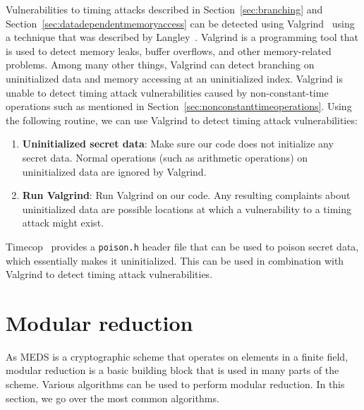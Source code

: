 \documentclass[11pt,a4paper]{report}
\theoremstyle{definition}
\begin{document}
Vulnerabilities to timing attacks described in Section~\ref{sec:branching} and Section~\ref{sec:datadependentmemoryaccess} can be detected using Valgrind~\cite{nethercote2007valgrind} using a technique that was described by Langley~\cite{langley2010checking}. Valgrind is a programming tool that is used to detect memory leaks, buffer overflows, and other memory-related problems. Among many other things, Valgrind can detect branching on uninitialized data and memory accessing at an uninitialized index. Valgrind is unable to detect timing attack vulnerabilities caused by non-constant-time operations such as mentioned in Section~\ref{sec:nonconstanttimeoperations}. Using the following routine, we can use Valgrind to detect timing attack vulnerabilities:
\begin{enumerate}
  \item \textbf{Uninitialized secret data}: Make sure our code does not initialize any secret data. Normal operations (such as arithmetic operations) on uninitialized data are ignored by Valgrind.
  \item \textbf{Run Valgrind}: Run Valgrind on our code. Any resulting complaints about uninitialized data are possible locations at which a vulnerability to a timing attack might exist.
\end{enumerate}

Timecop~\cite{timecop} provides a \texttt{poison.h} header file that can be used to poison secret data, which essentially makes it uninitialized. This can be used in combination with Valgrind to detect timing attack vulnerabilities.

\section{Modular reduction}
\label{sec:preliminariesmodularreduction}
As MEDS is a cryptographic scheme that operates on elements in a finite field, modular reduction is a basic building block that is used in many parts of the scheme. Various algorithms can be used to perform modular reduction. In this section, we go over the most common algorithms.
\end{document}
